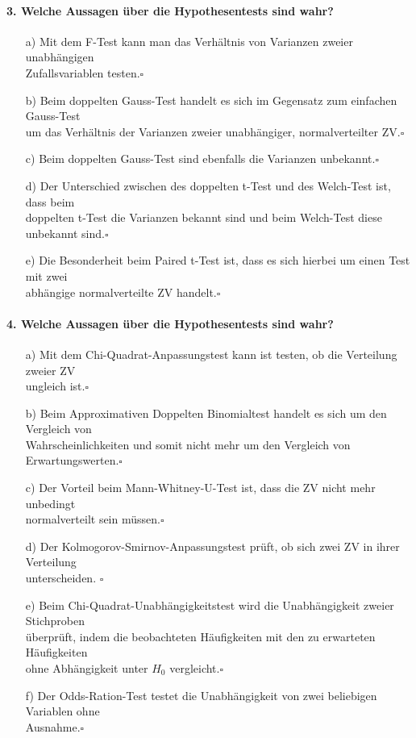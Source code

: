 \documentclass[a4paper]{article}
\begin{document}
\paragraph{3. Welche Aussagen über die Hypothesentests sind wahr? }
\begin{itemize}
    \item[a)]Mit dem F-Test kann man das Verhältnis von Varianzen zweier unabhängigen\\ Zufallsvariablen testen.\hfill $\square$
    \item[b)]Beim doppelten Gauss-Test handelt es sich im Gegensatz zum einfachen Gauss-Test\\ um das Verhältnis der Varianzen zweier unabhängiger, normalverteilter ZV.\hfill $\square$
    \item[c)]Beim doppelten Gauss-Test sind ebenfalls die Varianzen unbekannt.\hfill $\square$
    \item[d)]Der Unterschied zwischen des doppelten t-Test und des Welch-Test ist, dass beim\\ doppelten t-Test die Varianzen bekannt sind und beim Welch-Test diese unbekannt sind.\hfill $\square$
    \item[e)]Die Besonderheit beim Paired t-Test ist, dass es sich hierbei um einen Test mit zwei\\ abhängige normalverteilte ZV handelt.\hfill $\square$
 \end{itemize}
    
\paragraph{4. Welche Aussagen über die Hypothesentests sind wahr?} \begin{itemize}
    \item[a)]Mit dem Chi-Quadrat-Anpassungstest kann ist testen, ob die Verteilung zweier ZV \\ungleich ist.\hfill $\square$
    \item[b)]Beim Approximativen Doppelten Binomialtest handelt es sich um den Vergleich von\\ Wahrscheinlichkeiten und somit nicht mehr um den Vergleich von Erwartungswerten.\hfill $\square$
    \item[c)]Der Vorteil beim Mann-Whitney-U-Test ist, dass die ZV nicht mehr unbedingt\\ normalverteilt sein müssen.\hfill $\square$
    \item[d)]Der Kolmogorov-Smirnov-Anpassungstest prüft, ob sich zwei ZV in ihrer Verteilung\\ unterscheiden. \hfill $\square$
    \item[e)]Beim Chi-Quadrat-Unabhängigkeitstest wird die Unabhängigkeit zweier Stichproben\\ überprüft, indem die beobachteten Häufigkeiten mit den zu erwarteten Häufigkeiten \\ohne Abhängigkeit unter $H_0$ vergleicht.\hfill $\square$
    \item[f)]Der Odds-Ration-Test testet die Unabhängigkeit von zwei beliebigen Variablen ohne\\ Ausnahme.\hfill $\square$
\end{itemize}   
  
\end{document}
